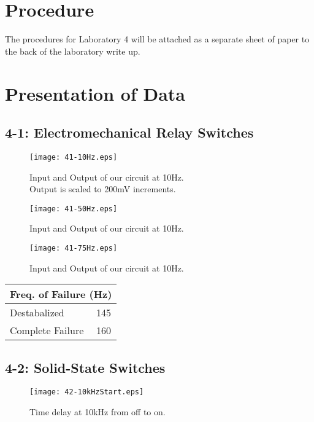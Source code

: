 \documentclass[%
 aip,
 jmp,
 amsmath,
 amssymb,
 reprint,%
 numerical,
 longbibliography,
]{revtex4-1}
\begin{document}
\section{Procedure}

The procedures for Laboratory 4 will be attached as a separate sheet of paper to the back
of the laboratory write up.

\section{Presentation of Data}

	\subsection{4-1: Electromechanical Relay Switches}
	
	\begin{figure}[H]
	\texttt{[image: 41-10Hz.eps]}
	\caption{Input and Output of our circuit at 10Hz.\\
	Output is scaled to 200mV increments.}
	\end{figure}	
	
	\begin{figure}[H]
	\texttt{[image: 41-50Hz.eps]}
	\caption{Input and Output of our circuit at 10Hz.}
	\end{figure}
	
	\begin{figure}[H]
	\texttt{[image: 41-75Hz.eps]}
	\caption{Input and Output of our circuit at 10Hz.}
	\end{figure}
	
	\begin{tabularx}{0.45\textwidth}[t]{| X | X |}
	\hline
	\multicolumn{2}{|c|}{Freq. of Failure (Hz)}\\
	\hline
	Destabalized & 145 \\ \hline
	Complete Failure & 160 \\ \hline
	\end{tabularx}

	\subsection{4-2: Solid-State Switches}
	
	\begin{figure}[H]
	\texttt{[image: 42-10kHzStart.eps]}
	\caption{Time delay at 10kHz from off to on.}
	\end{figure}	
	
\end{document}
